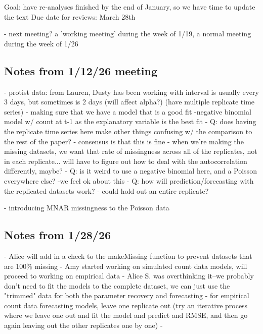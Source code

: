 \documentclass{article}
\begin{document}
Goal: have re-analyses finished by the end of January, so we have time to update the text 
Due date for reviews: March 28th 

- next meeting? a 'working meeting' during the week of 1/19, a normal meeting during the week of 1/26


\subsection{Notes from 1/12/26 meeting}
- protist data: from Lauren, Dusty has been working with
    interval is usually every 3 days, but sometimes is 2 days (will affect alpha?) (have multiple replicate time series)
    - making sure that we have a model that is a good fit -negative binomial model w/ count at t-1 as the explanatory variable is the best fit 
    - Q: does having the replicate time series here make other things confusing w/ the comparison to the rest of the paper? 
        - consensus is that this is fine 
        - when we're making the missing datasets, we want that rate of missingness across all of the replicates, not in each replicate... will have to figure out how to deal with the autocorrelation differently, maybe? 
    - Q: is it weird to use a negative binomial here, and a Poisson everywhere else? 
        -we feel ok about this
    - Q: how will prediction/forecasting with the replicated datasets work? 
        - could hold out an entire replicate? 

    - introducing MNAR missingness to the Poisson data 

\subsection{Notes from 1/28/26}
- Alice will add in a check to the makeMissing function to prevent datasets that are 100\% missing 
- Amy started working on simulated count data models, will proceed to working on empirical data
- Alice S. was overthinking it--we probably don't need to fit the models to the complete dataset, we can just use the "trimmed" data for both the parameter recovery and forecasting  
- for empirical count data forecasting models, leave one replicate out (try an iterative process where we leave one out and fit the model and predict and RMSE, and then go again leaving out the other replicates one by one)
- 
\end{document}
